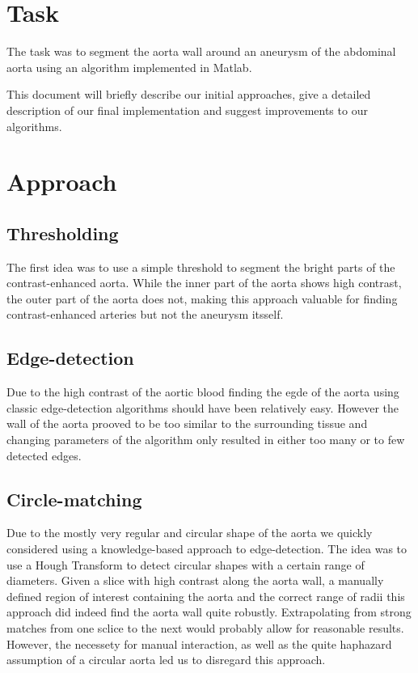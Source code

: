 \documentclass[a4paper]{scrartcl}
\begin{document}


\section*{Task}

The task was to segment the aorta wall around an aneurysm of the abdominal
aorta using an algorithm implemented in Matlab. 

This document will briefly describe our initial approaches, give a detailed
description of our final implementation and suggest improvements to our
algorithms.

\section*{Approach}

\subsection*{Thresholding}
The first idea was to use a simple threshold to segment the bright parts of the
contrast-enhanced aorta. While the inner part of the aorta shows high contrast,
the outer part of the aorta does not, making this approach valuable for finding
contrast-enhanced arteries but not the aneurysm itsself.

\subsection*{Edge-detection}
Due to the high contrast of the aortic blood finding the egde of the aorta
using classic edge-detection algorithms should have been relatively easy. 
However the wall of the aorta prooved to be too similar to the surrounding 
tissue and changing parameters of the algorithm only resulted in either too
many or to few detected edges.

\subsection*{Circle-matching}
Due to the mostly very regular and circular shape of the aorta we quickly 
considered using a knowledge-based approach to edge-detection. The idea was to
use a Hough Transform to detect circular shapes with a certain range of
diameters. Given a slice with high contrast along the aorta wall, a manually
defined region of interest containing the aorta and the correct range of radii
this approach did indeed find the aorta wall quite robustly. Extrapolating from
strong matches from one sclice to the next would probably allow for reasonable
results. However, the necessety for manual interaction, as well as the quite
haphazard assumption of a circular aorta led us to disregard this approach.
\end{document}
